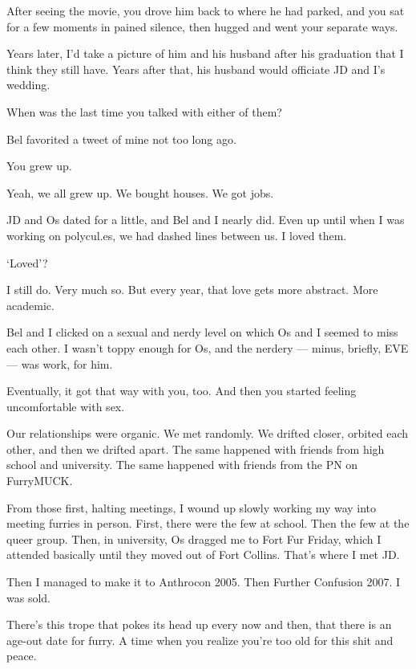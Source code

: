 \begin{paracol}{2}
\begin{leftcolumn}
\begin{ally}
After seeing the movie, you drove him back to where he had parked, and you sat for a few moments in pained silence, then hugged and went your separate ways.
\end{ally}
Years later, I'd take a picture of him and his husband after his graduation that I think they still have. Years after that, his husband would officiate JD and I's wedding.

\begin{ally}
When was the last time you talked with either of them?
\end{ally}
Bel favorited a tweet of mine not too long ago.

\begin{ally}
You grew up.
\end{ally}
Yeah, we all grew up. We bought houses. We got jobs.

JD and Os dated for a little, and Bel and I nearly did. Even up until when I was working on polycul.es, we had dashed lines between us. I loved them.

\begin{ally}
`Loved'?
\end{ally}
I still do. Very much so. But every year, that love gets more abstract. More academic.

Bel and I clicked on a sexual and nerdy level on which Os and I seemed to miss each other. I wasn't toppy enough for Os, and the nerdery --- minus, briefly, EVE --- was work, for him.

\begin{ally}
Eventually, it got that way with you, too. And then you started feeling uncomfortable with sex.
\end{ally}
Our relationships were organic. We met randomly. We drifted closer, orbited each other, and then we drifted apart. The same happened with friends from high school and university. The same happened with friends from the PN on FurryMUCK.

From those first, halting meetings, I wound up slowly working my way into meeting furries in person. First, there were the few at school. Then the few at the queer group. Then, in university, Os dragged me to Fort Fur Friday, which I attended basically until they moved out of Fort Collins. That's where I met JD.

Then I managed to make it to Anthrocon 2005. Then Further Confusion 2007. I was sold.

There's this trope that pokes its head up every now and then, that there is an age-out date for furry. A time when you realize you're too old for this shit and peace.


\end{leftcolumn}
\end{paracol}
